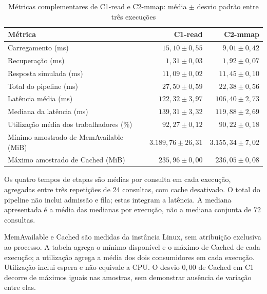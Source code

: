 \documentclass[12pt,a4paper]{article}
\begin{document}
  \begin{table}[H]
  \centering
  \caption{Métricas complementares de C1-read e C2-mmap: média $\pm$ desvio padrão entre três execuções}
  \label{tab:metricas-complementares}
  \begin{singlespace}\footnotesize
  \begin{tabularx}{\textwidth}{>{\raggedright\arraybackslash}Xrr}
  \toprule\textbf{Métrica} & \textbf{C1-read} & \textbf{C2-mmap}\\\midrule
  Carregamento (ms) & $15,10\pm0,55$ & $9,01\pm0,42$\\
  Recuperação (ms) & $1,31\pm0,03$ & $1,92\pm0,07$\\
  Resposta simulada (ms) & $11,09\pm0,02$ & $11,45\pm0,10$\\
  Total do pipeline (ms) & $27,50\pm0,59$ & $22,38\pm0,56$\\
  Latência média (ms) & $122,32\pm3,97$ & $106,40\pm2,73$\\
  Mediana da latência (ms) & $139,31\pm3,32$ & $119,88\pm2,69$\\
  Utilização média dos trabalhadores (\%) & $92,27\pm0,12$ & $90,22\pm0,18$\\
  Mínimo amostrado de MemAvailable (MiB) & $3.189,76\pm26,31$ & $3.155,34\pm7,02$\\
  Máximo amostrado de Cached (MiB) & $235,96\pm0,00$ & $236,05\pm0,08$\\
  \bottomrule
  \end{tabularx}
  \end{singlespace}
  \par\smallskip{}
  \end{table}
  Os quatro tempos de etapas são médias por consulta em cada execução, agregadas entre três repetições de 24 consultas, com cache desativado. O total do pipeline não inclui admissão e fila; estas integram a latência. A mediana apresentada é a média das medianas por execução, não a mediana conjunta de 72 consultas.

  MemAvailable e Cached são medidas da instância Linux, sem atribuição exclusiva ao processo. A tabela agrega o mínimo disponível e o máximo de Cached de cada execução; a utilização agrega a média dos dois consumidores em cada execução. Utilização inclui espera e não equivale a CPU. O desvio $0{,}00$ de Cached em C1 decorre de máximos iguais nas amostras, sem demonstrar ausência de variação entre elas.
\end{document}
